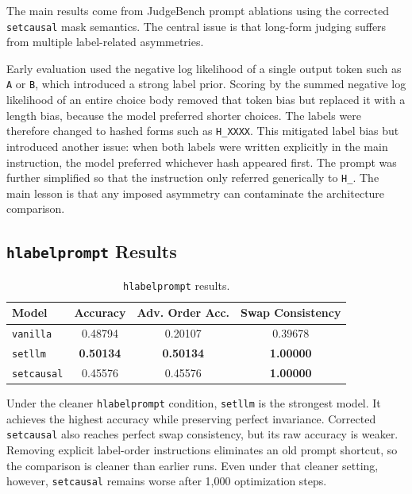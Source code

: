 \documentclass{article}
\begin{document}
The main results come from JudgeBench prompt ablations using the corrected \texttt{setcausal} mask semantics. The central issue is that long-form judging suffers from multiple label-related asymmetries.

Early evaluation used the negative log likelihood of a single output token such as \texttt{A} or \texttt{B}, which introduced a strong label prior. Scoring by the summed negative log likelihood of an entire choice body removed that token bias but replaced it with a length bias, because the model preferred shorter choices. The labels were therefore changed to hashed forms such as \texttt{H\_XXXX}. This mitigated label bias but introduced another issue: when both labels were written explicitly in the main instruction, the model preferred whichever hash appeared first. The prompt was further simplified so that the instruction only referred generically to \texttt{H\_}. The main lesson is that any imposed asymmetry can contaminate the architecture comparison.

\subsection{\texttt{hlabelprompt} Results}

\begin{table}[t]
\centering
\small
\begin{tabular}{lccc}
\toprule
Model & Accuracy & Adv. Order Acc. & Swap Consistency \\
\midrule
\texttt{vanilla} & 0.48794 & 0.20107 & 0.39678 \\
\texttt{setllm} & \textbf{0.50134} & \textbf{0.50134} & \textbf{1.00000} \\
\texttt{setcausal} & 0.45576 & 0.45576 & \textbf{1.00000} \\
\bottomrule
\end{tabular}
\caption{\texttt{hlabelprompt} results.}
\label{tab:hlabel}
\end{table}

Under the cleaner \texttt{hlabelprompt} condition, \texttt{setllm} is the strongest model. It achieves the highest accuracy while preserving perfect invariance. Corrected \texttt{setcausal} also reaches perfect swap consistency, but its raw accuracy is weaker. Removing explicit label-order instructions eliminates an old prompt shortcut, so the comparison is cleaner than earlier runs. Even under that cleaner setting, however, \texttt{setcausal} remains worse after 1,000 optimization steps.
\end{document}
